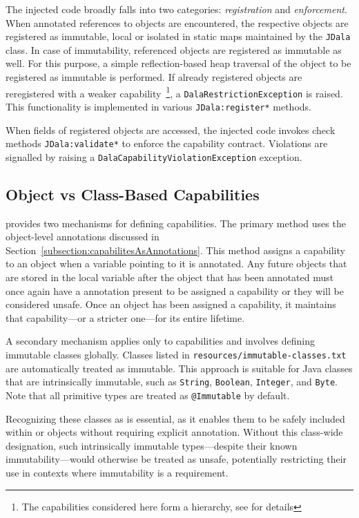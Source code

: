 The injected code broadly falls into two categories: \textit{registration} and \textit{enforcement}. When  annotated references to objects are encountered, the respective objects are registered as immutable, local or isolated in static maps maintained by the \texttt{JDala} class. In case of immutability, referenced objects are registered as immutable as well. For this purpose, a simple reflection-based  heap traversal of the object to be registered as immutable is performed.  If already registered objects are reregistered with a weaker capability~\footnote{The capabilities considered here form a hierarchy, see \cite{Dala_Paper} for details}, a \texttt{DalaRestrictionException} is raised.  This functionality is implemented in various \texttt{JDala:register*} methods.

When fields of registered objects are accessed, the injected code invokes check methods \texttt{JDala:validate*} to enforce the capability contract. Violations are signalled by raising a \texttt{DalaCapabilityViolationException} exception.


\subsection{Object vs Class-Based Capabilities}


\jdala provides two mechanisms for defining capabilities. The primary method uses the object-level annotations discussed in Section~\ref{subsection:capabilitesAsAnnotations}. This method assigns a capability to an object when a variable pointing to it is annotated. Any future objects that are stored in the local variable after the object that has been annotated must once again have a annotation present to be assigned a capability or they will be considered unsafe.
Once an object has been assigned a capability, it maintains that capability—or a stricter one—for its entire lifetime.

A secondary mechanism applies only to \Immutable capabilities and involves defining immutable classes globally. Classes listed in \texttt{resources/immutable-classes.txt} are automatically treated as immutable. This approach is suitable for Java classes that are intrinsically immutable, such as \texttt{String}, \texttt{Boolean}, \texttt{Integer}, and \texttt{Byte}. Note that all primitive types are treated as \texttt{@Immutable} by default.

Recognizing these classes as \Immutable is essential, as it enables them to be safely included within \Local or \Isolated objects without requiring explicit annotation. Without this class-wide designation, such intrinsically immutable types—despite their known immutability—would otherwise be treated as unsafe, potentially restricting their use in contexts where immutability is a requirement.

